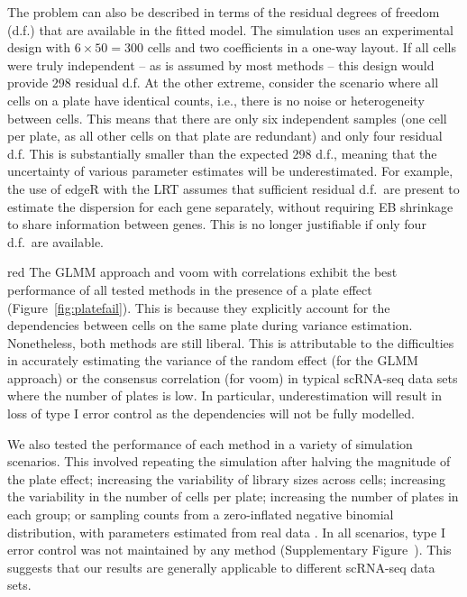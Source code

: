 \documentclass[oupdraft]{bio}
\begin{document}
The problem can also be described in terms of the residual degrees of freedom (d.f.) that are available in the fitted model.
The simulation uses an experimental design with $6 \times 50 =  300$ cells and two coefficients in a one-way layout.
If all cells were truly independent -- as is assumed by most methods -- this design would provide 298 residual d.f. 
At the other extreme, consider the scenario where all cells on a plate have identical counts, i.e., there is no noise or heterogeneity between cells.
This means that there are only six independent samples (one cell per plate, as all other cells on that plate are redundant) and only four residual d.f.
This is substantially smaller than the expected 298 d.f., meaning that the uncertainty of various parameter estimates will be underestimated.
For example, the use of edgeR with the LRT assumes that sufficient residual d.f.\ are present to estimate the dispersion for each gene separately,
    without requiring EB shrinkage to share information between genes.
This is no longer justifiable if only four d.f.\ are available.

\begin{color}{red}
The GLMM approach and voom with correlations exhibit the best performance of all tested methods in the presence of a plate effect (Figure~\ref{fig:platefail}).
This is because they explicitly account for the dependencies between cells on the same plate during variance estimation.
Nonetheless, both methods are still liberal.
This is attributable to the difficulties in accurately estimating the variance of the random effect (for the GLMM approach) or the consensus correlation (for voom) in typical scRNA-seq data sets where the number of plates is low.
In particular, underestimation will result in loss of type I error control as the dependencies will not be fully modelled.


We also tested the performance of each method in a variety of simulation scenarios.
This involved repeating the simulation after halving the magnitude of the plate effect; increasing the variability of library sizes across cells; increasing the variability in the number of cells per plate; increasing the number of plates in each group; or sampling counts from a zero-inflated negative binomial distribution, with parameters estimated from real data \citep{zeilis2008regression}.
In all scenarios, type I error control was not maintained by any method (Supplementary Figure~\suppfailsim{}).
This suggests that our results are generally applicable to different scRNA-seq data sets.
\end{color}
\end{document}
